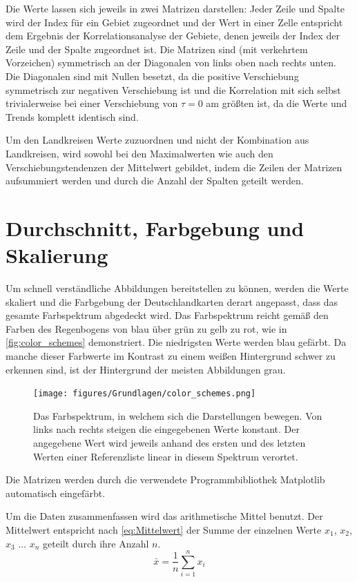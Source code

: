Die Werte lassen sich jeweils in zwei Matrizen darstellen: Jeder Zeile und Spalte wird der Index für ein Gebiet zugeordnet und der Wert in einer Zelle entspricht dem Ergebnis der Korrelationsanalyse der Gebiete, denen jeweils der Index der Zeile und der Spalte zugeordnet ist.
Die Matrizen sind (mit verkehrtem Vorzeichen) symmetrisch an der Diagonalen von links oben nach rechts unten. Die Diagonalen sind mit Nullen besetzt, da die positive Verschiebung symmetrisch zur negativen Verschiebung ist und die Korrelation mit sich selbst trivialerweise bei einer Verschiebung von $\tau=0$ am größten ist, da die Werte und Trends komplett identisch sind.

Um den Landkreisen Werte zuzuordnen und nicht der Kombination aus Landkreisen, wird sowohl bei den Maximalwerten wie auch den Verschiebungstendenzen der Mittelwert gebildet, indem die Zeilen der Matrizen aufsummiert werden und durch die Anzahl der Spalten geteilt werden.
\section{Durchschnitt, Farbgebung und Skalierung}\label{sec:Durchschnitt, Farbgebung und Skalierung}
Um schnell verständliche Abbildungen bereitstellen zu können, werden die Werte skaliert und die Farbgebung der Deutschlandkarten derart angepasst, dass das gesamte Farbspektrum abgedeckt wird. Das Farbspektrum reicht gemäß den Farben des Regenbogens von blau über grün zu gelb zu rot, wie in \autoref{fig:color_schemes} demonstriert. Die niedrigsten Werte werden blau gefärbt.
Da manche dieser Farbwerte im Kontrast zu einem weißen Hintergrund schwer zu erkennen sind, ist der Hintergrund der meisten Abbildungen grau.

\begin{figure}
    \centering
    \texttt{[image: figures/Grundlagen/color\_schemes.png]}
    \caption{Das Farbspektrum, in welchem sich die Darstellungen bewegen. Von links nach rechts steigen die eingegebenen Werte konstant. Der angegebene Wert wird jeweils anhand des ersten und des letzten Werten einer Referenzliste linear in diesem Spektrum verortet.}
    \label{fig:color_schemes}
\end{figure}

Die Matrizen werden durch die verwendete Programmbibliothek \glqq{}Matplotlib\grqq{} automatisch eingefärbt.


Um die Daten zusammenfassen wird das arithmetische Mittel benutzt. Der Mittelwert entspricht nach \autoref{eq:Mittelwert} der Summe der einzelnen Werte $x_1$, $x_2$, $x_3$ ... $x_n$ geteilt durch ihre Anzahl $n$.
\begin{equation}\label{eq:Mittelwert}
    \bar x = \frac{1}{n}\sum_{i=1}^n x_i
\end{equation}